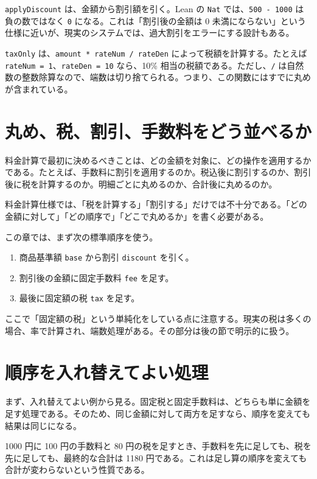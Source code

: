 \texttt{applyDiscount} は、金額から割引額を引く。Lean の \texttt{Nat} では、\texttt{500 - 1000} は負の数ではなく \texttt{0} になる。これは「割引後の金額は 0 未満にならない」という仕様に近いが、現実のシステムでは、過大割引をエラーにする設計もある。

\texttt{taxOnly} は、\texttt{amount * rateNum / rateDen} によって税額を計算する。たとえば \texttt{rateNum = 1}、\texttt{rateDen = 10} なら、10\% 相当の税額である。ただし、\texttt{/} は自然数の整数除算なので、端数は切り捨てられる。つまり、この関数にはすでに丸めが含まれている。

\section{丸め、税、割引、手数料をどう並べるか}

料金計算で最初に決めるべきことは、どの金額を対象に、どの操作を適用するかである。たとえば、手数料に割引を適用するのか。税込後に割引するのか、割引後に税を計算するのか。明細ごとに丸めるのか、合計後に丸めるのか。

\begin{softwarebox}
料金計算仕様では、「税を計算する」「割引する」だけでは不十分である。「どの金額に対して」「どの順序で」「どこで丸めるか」を書く必要がある。
\end{softwarebox}

この章では、まず次の標準順序を使う。

\begin{enumerate}
\item 商品基準額 \texttt{base} から割引 \texttt{discount} を引く。
\item 割引後の金額に固定手数料 \texttt{fee} を足す。
\item 最後に固定額の税 \texttt{tax} を足す。
\end{enumerate}

ここで「固定額の税」という単純化をしている点に注意する。現実の税は多くの場合、率で計算され、端数処理がある。その部分は後の節で明示的に扱う。

\section{順序を入れ替えてよい処理}

まず、入れ替えてよい例から見る。固定税と固定手数料は、どちらも単に金額を足す処理である。そのため、同じ金額に対して両方を足すなら、順序を変えても結果は同じになる。

\begin{intuitionbox}
1000 円に 100 円の手数料と 80 円の税を足すとき、手数料を先に足しても、税を先に足しても、最終的な合計は 1180 円である。これは足し算の順序を変えても合計が変わらないという性質である。
\end{intuitionbox}

